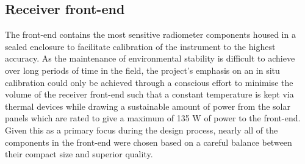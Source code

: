 \subsection{Receiver front-end}\label{sec:frontend}
The front-end contains the most sensitive radiometer components housed in a sealed enclosure to facilitate calibration of the instrument to the highest accuracy. As the maintenance of environmental stability is difficult to achieve over long periods of time in the field, the project’s emphasis on an in situ calibration could only be achieved through a conscious effort to minimise the volume of the receiver front-end such that a constant temperature is kept via thermal devices while drawing a sustainable amount of power from the solar panels which are rated to give a maximum of 135 W of power to the front-end. Given this as a primary focus during the design process, nearly all of the components in the front-end were chosen based on a careful balance between their compact size and superior quality.


